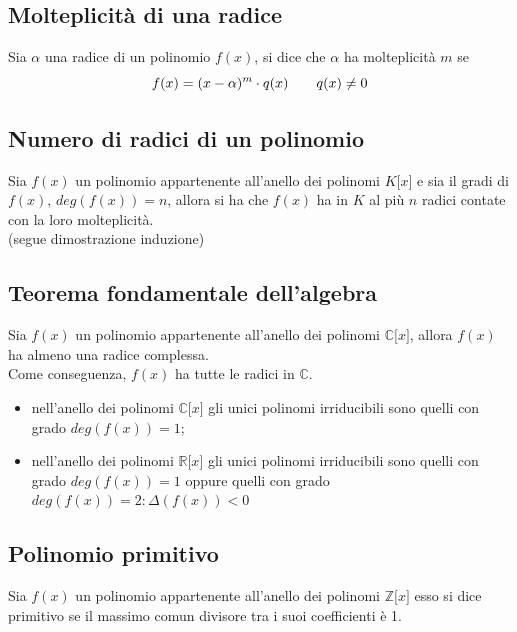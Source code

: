 \begin{flushleft}
\subsection{Molteplicità di una radice}
Sia $\alpha$ una radice di un polinomio $f(x)$, si dice che $\alpha$ ha molteplicità $m$ se
\[f(x) = (x-\alpha)^m\cdot q(x)\hspace{20px}q(x)\neq 0\]



\subsection{Numero di radici di un polinomio}
Sia $f(x)$ un polinomio appartenente all'anello dei polinomi $K\big[x\big]$ e sia il gradi di $f(x)$, $deg(f(x)) = n$, allora si ha che $f(x)$ ha in $K$ al più $n$ radici contate con la loro molteplicità.\\
(segue dimostrazione induzione)
\\ \vspace{300px}

\subsection{Teorema fondamentale dell'algebra}
Sia $f(x)$ un polinomio appartenente all'anello dei polinomi $\mathbb{C}\big[x\big]$, allora $f(x)$ ha almeno una radice complessa.\\
Come conseguenza, $f(x)$ ha tutte le radici in $\mathbb{C}$.
\begin{itemize}
    \item nell'anello dei polinomi $\mathbb{C}\big[x\big]$ gli unici polinomi irriducibili sono quelli con grado $deg(f(x)) = 1$;
    
    \item nell'anello dei polinomi $\mathbb{R}\big[x\big]$ gli unici polinomi irriducibili sono quelli con grado $deg(f(x)) = 1$ oppure quelli con grado $deg(f(x)) = 2:  \Delta(f(x)) <0$
    
\end{itemize}


\subsection{Polinomio primitivo}
Sia $f(x)$ un polinomio appartenente all'anello dei polinomi $\mathbb{Z}\big[x\big]$ esso si dice primitivo se il massimo comun divisore tra i suoi coefficienti è 1.


\end{flushleft}
